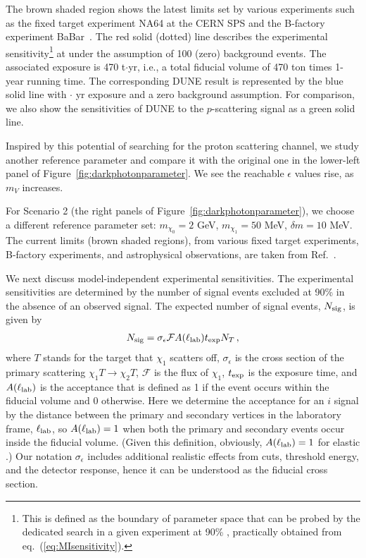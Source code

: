 The brown shaded region shows the latest limits set by various experiments such as the fixed target experiment NA64 at the CERN SPS and the B-factory experiment BaBar~\cite{Banerjee:2017hhz}.
The red solid (dotted) line describes the experimental sensitivity\footnote{This is defined as the boundary of parameter space that can be probed by the dedicated search in a given experiment at 90\% , practically obtained from eq.~(\ref{eq:MIsensitivity}).} at  under the assumption of 100 (zero) background events. 
The associated exposure is 470 t$\cdot$yr, i.e., a total fiducial volume of 470 ton times 1-year running time. 
The corresponding DUNE result is represented by the blue solid line with \fdfiducialmass $\cdot$ yr exposure and a zero background assumption. 
For comparison, we also show the sensitivities of DUNE to the $p$-scattering signal as a green solid line. 

Inspired by this potential of searching for the proton scattering channel, we study another reference parameter and compare it with the original one in the lower-left panel of Figure~\ref{fig:darkphotonparameter}. 
We see the reachable $\epsilon$ values rise, as $m_V$ increases. 


For Scenario 2 (the right panels of Figure~\ref{fig:darkphotonparameter}), we choose a different reference parameter set: $m_{\chi_0} = 2$ GeV, $m_{\chi_1} = 50$ MeV, $\delta m = 10$ MeV. 
The current limits (brown shaded regions), from various fixed target experiments, B-factory experiments, and astrophysical observations, are taken from Ref.~\cite{Banerjee:2018vgk}.


We next discuss model-independent experimental sensitivities. 
The experimental sensitivities are determined by the number of signal events excluded at 90\%  in the absence of an observed signal.
The expected number of signal events, $N_{\rm sig}$, is given by
\begin{align}
N_{\rm sig} = \sigma_\epsilon \mathcal F A(\ell_{\rm lab}) t_{\rm exp} N_T\,,
\label{eq:NS}
\end{align}
where $T$ stands for the target that $\chi_1$ scatters off, $\sigma_\epsilon$ is the cross section of the primary scattering $\chi_1 T \to \chi_2 T$, $\mathcal F$ is the flux of $\chi_1$, $t_{\rm exp}$ is the exposure time, and $A(\ell_{\rm lab})$ is the acceptance that is defined as 1 if the event occurs within the fiducial volume and 0 otherwise.
Here we determine the acceptance for an $i$ signal by the distance between the primary and secondary vertices in the laboratory frame, $\ell_{\rm lab}$, so $A(\ell_{\rm lab}) = 1$ when both the primary and secondary events occur inside the fiducial volume. (Given this definition, obviously, $A(\ell_{\rm lab}) = 1$ for elastic .)
Our notation $\sigma_\epsilon$ includes additional realistic effects from cuts, threshold energy, and the detector response, hence it can be understood as the fiducial cross section.


